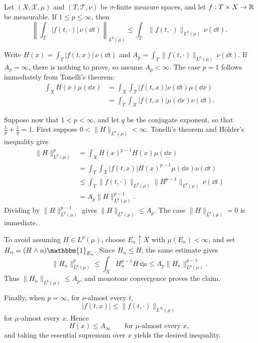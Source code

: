 \begin{theorembox}
    Let $(X,\mathcal{X},\mu)$ and $(T,\mathcal{T},\nu)$ be
    $\sigma$-finite measure spaces, and let
    $f : T \times X \to \mathbb{R}$ be measurable. If $1 \leq p \leq \infty$, then
    $$\left\|\int_T |f(t,\cdot)|\,\nu(\dd t)\right\|_{L^p(\mu)}
    \leq \int_T \|f(t,\cdot)\|_{L^p(\mu)}\,\nu(\dd t).$$
\end{theorembox}
\begin{proofbox}
    Write $H(x)=\int_T |f(t,x)|\,\nu(\dd t)$ and
    $A_p=\int_T\|f(t,\cdot)\|_{L^p(\mu)}\,\nu(\dd t)$.
    If $A_p=\infty$, there is nothing to prove, so assume $A_p<\infty$.
    The case $p=1$ follows immediately from Tonelli's theorem:
    $$\begin{aligned}
        \int_{X} H(x)\mu(\dd x)
        &= \int_{X}\int_{T}|f(t,x)|\nu(\dd t)\mu(\dd x) \\
        &= \int_{T}\int_{X}|f(t,x)|\mu(\dd x)\nu(\dd t).
    \end{aligned}$$

    Suppose now that $1<p<\infty$, and let $q$ be the conjugate exponent,
    so that $\frac{1}{p}+\frac{1}{q}=1$.
    First suppose $0<\|H\|_{L^p(\mu)}<\infty$.
    Tonelli's theorem and H\"older's inequality give
    $$\begin{aligned}
        \|H\|_{L^p(\mu)}^p
        &= \int_{X} H(x)^{p-1}H(x)\mu(\dd x) \\
        &= \int_{T}\int_{X}|f(t,x)|H(x)^{p-1}\mu(\dd x)\nu(\dd t) \\
        &\leq \int_T \|f(t,\cdot)\|_{L^p(\mu)}
        \|H^{p-1}\|_{L^q(\mu)}\,\nu(\dd t) \\
        &= A_p\|H\|_{L^p(\mu)}^{p-1}.
    \end{aligned}$$
    Dividing by $\|H\|_{L^p(\mu)}^{p-1}$ gives $\|H\|_{L^p(\mu)}\leq A_p$.
    The case $\|H\|_{L^p(\mu)}=0$ is immediate.

    To avoid assuming $H\in L^p(\mu)$, choose $E_n\uparrow X$ with
    $\mu(E_n)<\infty$, and set $H_n=(H\wedge n)\mathbbm{1}_{E_n}$.
    Since $H_n\leq H$, the same estimate gives
    $$\|H_n\|_{L^p(\mu)}^p
    \leq \int_X H_n^{p-1}H\,\dd\mu
    \leq A_p\|H_n\|_{L^p(\mu)}^{p-1}.$$
    Thus $\|H_n\|_{L^p(\mu)}\leq A_p$, and monotone convergence proves
    the claim.

    Finally, when $p=\infty$, for $\nu$-almost every $t$,
    $$|f(t,x)|\leq \|f(t,\cdot)\|_{L^\infty(\mu)}$$
    for $\mu$-almost every $x$. Hence
    $$H(x)\leq A_\infty\qquad\text{for $\mu$-almost every $x$},$$
    and taking the essential supremum over $x$ yields the desired inequality.
\end{proofbox}

